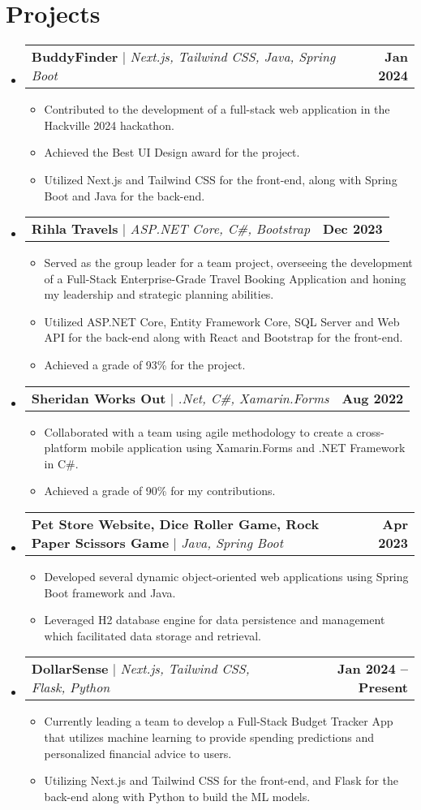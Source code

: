 \documentclass[a4,11pt]{article}
\makeatletter
\newcommand{\resumeItem}[1]{
  \item\small{
    {#1 \vspace{-2pt}}
  }
}
\newcommand{\resumeProjectHeading}[2]{
    \item
    \begin{tabular*}{1.001\textwidth}{l@{\extracolsep{\fill}}r}
      \small#1 & \textbf{\small #2}\\
    \end{tabular*}\vspace{-7pt}
}
\newcommand{\resumeSubHeadingListStart}{\begin{itemize}[leftmargin=0.0in, label={}]}
\newcommand{\resumeSubHeadingListEnd}{\end{itemize}}
\newcommand{\resumeItemListStart}{\begin{itemize}}
\newcommand{\resumeItemListEnd}{\end{itemize}\vspace{-5pt}}
\makeatother
\begin{document}
\section{Projects}
    \vspace{-5pt}
    \resumeSubHeadingListStart
      \resumeProjectHeading
          {\textbf{BuddyFinder} $|$ \emph{Next.js, Tailwind CSS, Java, Spring Boot}}{Jan 2024}
          \resumeItemListStart
            \resumeItem{Contributed to the development of a full-stack web application in the Hackville 2024 hackathon.}
            \resumeItem{Achieved the Best UI Design award for the project.}
            \resumeItem{Utilized Next.js and Tailwind CSS for the front-end, along with Spring Boot and Java for the back-end.}
          \resumeItemListEnd
          \vspace{-13pt}
      \resumeProjectHeading
          {\textbf{Rihla Travels} $|$ \emph{ASP.NET Core, C\#, Bootstrap}}{Dec 2023}
          \resumeItemListStart
            \resumeItem{Served as the group leader for a team project, overseeing the development of a Full-Stack Enterprise-Grade Travel Booking Application and honing my leadership and strategic planning abilities.}
            \resumeItem{Utilized ASP.NET Core, Entity Framework Core, SQL Server and Web API for the back-end along with React and Bootstrap for the front-end.}
            \resumeItem{Achieved a grade of 93\% for the project.}
          \resumeItemListEnd
          \vspace{-13pt}
      \resumeProjectHeading
          {\textbf{Sheridan Works Out} $|$ \emph{.Net, C\#, Xamarin.Forms}}{Aug 2022}
          \resumeItemListStart
            \resumeItem{Collaborated with a team using agile methodology to create a cross-platform mobile application using Xamarin.Forms and .NET Framework in C\#.}
            \resumeItem{Achieved a grade of 90\% for my contributions.}
          \resumeItemListEnd
          \vspace{-13pt}
      \resumeProjectHeading
          {\textbf{Pet Store Website, Dice Roller Game, Rock Paper Scissors Game} $|$ \emph{Java, Spring Boot}}{Apr 2023}
          \resumeItemListStart
            \resumeItem{Developed several dynamic object-oriented web applications using Spring Boot framework and Java.}
            \resumeItem{Leveraged H2 database engine for data persistence and management which facilitated data storage and retrieval.}
          \resumeItemListEnd
          \vspace{-13pt}
      \resumeProjectHeading
          {\textbf{DollarSense} $|$ \emph{Next.js, Tailwind CSS, Flask, Python}}{Jan 2024 -- Present}
          \resumeItemListStart
            \resumeItem{Currently leading a team to develop a Full-Stack Budget Tracker App that utilizes machine learning to provide spending predictions and personalized financial advice to users.}
            \resumeItem{Utilizing Next.js and Tailwind CSS for the front-end, and Flask for the back-end along with Python to build the ML models.}
          \resumeItemListEnd
    \resumeSubHeadingListEnd
\vspace{-16pt}
\end{document}
